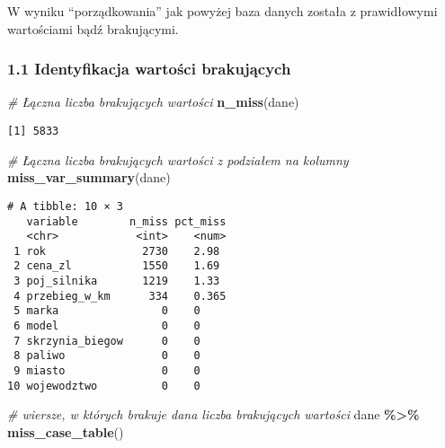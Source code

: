 \documentclass[
]{article}
\newenvironment{Shaded}{\begin{snugshade}}{\end{snugshade}}
\newcommand{\CommentTok}[1]{\textcolor[rgb]{0.56,0.35,0.01}{\textit{#1}}}
\newcommand{\FunctionTok}[1]{\textcolor[rgb]{0.13,0.29,0.53}{\textbf{#1}}}
\newcommand{\NormalTok}[1]{#1}
\newcommand{\SpecialCharTok}[1]{\textcolor[rgb]{0.81,0.36,0.00}{\textbf{#1}}}
\newcommand{\StringTok}[1]{\textcolor[rgb]{0.31,0.60,0.02}{#1}}
\begin{document}
\begin{Shaded}
\end{Shaded}

W wyniku ``porządkowania'' jak powyżej baza danych została z
prawidłowymi wartościami bądź brakującymi.

\subsubsection{1.1 Identyfikacja wartości
brakujących}\label{identyfikacja-wartoux15bci-brakujux105cych}

\begin{Shaded}
\begin{Highlighting}[]
\CommentTok{\# Łączna liczba brakujących wartości}
\FunctionTok{n\_miss}\NormalTok{(dane)}
\end{Highlighting}
\end{Shaded}

\begin{verbatim}
[1] 5833
\end{verbatim}

\begin{Shaded}
\begin{Highlighting}[]
\CommentTok{\# Łączna liczba brakujących wartości z podziałem na kolumny}
\FunctionTok{miss\_var\_summary}\NormalTok{(dane)}
\end{Highlighting}
\end{Shaded}

\begin{verbatim}
# A tibble: 10 × 3
   variable        n_miss pct_miss
   <chr>            <int>    <num>
 1 rok               2730    2.98 
 2 cena_zl           1550    1.69 
 3 poj_silnika       1219    1.33 
 4 przebieg_w_km      334    0.365
 5 marka                0    0    
 6 model                0    0    
 7 skrzynia_biegow      0    0    
 8 paliwo               0    0    
 9 miasto               0    0    
10 wojewodztwo          0    0  
\end{verbatim}

\begin{Shaded}
\begin{Highlighting}[]
\CommentTok{\# wiersze, w których brakuje dana liczba brakujących wartości}
\NormalTok{dane }\SpecialCharTok{\%\textgreater{}\%} 
  \FunctionTok{miss\_case\_table}\NormalTok{()}
\end{Highlighting}
\end{Shaded}
\end{document}
